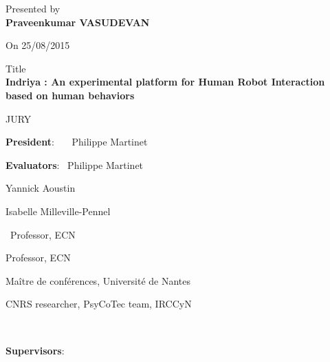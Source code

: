 \documentclass[11pt, openright]{Thesis} %
\begin{document}
\begin{titlepage}
\begin{center}
	\normalsize Presented by\\
	\vspace{0.1in}
	{\large \textbf{Praveenkumar VASUDEVAN}}
	\par
	\vspace{0.1in}
	On 25/08/2015
	\par
	\vspace{0.3in}
	\large Title\\
	\vspace{0.1in}
	\large \textbf{Indriya : An experimental platform for Human Robot Interaction based on human behaviors}
	\par
	\vspace{0.4in}
	\normalsize JURY
	\end{center}
	\par
	\vspace{0.2in}
	\noindent \begin{minipage}{0.5\textwidth}
	\begin{flushleft} 
	\textbf{President}: \  \  \ Philippe Martinet
	\par
	\vspace{0.2in}	
	\textbf{Evaluators}: \ Philippe Martinet
	\par
	\hspace{20mm} Yannick Aoustin
	\par
	\hspace{20mm} Isabelle Milleville-Pennel
	\par
	\end{flushleft}
	\end{minipage}
	\begin{minipage}{0.55\textwidth}
	\begin{flushleft} 
	\
	Professor, ECN
	\par
	\vspace{0.2in}	
	Professor, ECN
	\par
	Ma\^{i}tre de conf\'{e}rences, Universit\'{e} de Nantes
	\par
	CNRS researcher, PsyCoTec team, IRCCyN
	\end{flushleft}
	\end{minipage}
	\\
	\par
	\vspace{0.1in}	
	\noindent \textbf{Supervisors}:
	\\

\end{titlepage}
\end{document}
